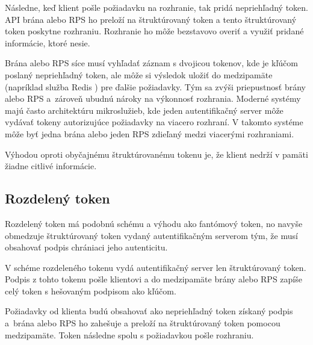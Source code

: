 Následne, keď klient pošle požiadavku na rozhranie, tak pridá nepriehľadný token. API brána alebo RPS ho preloží na štruktúrovaný token a tento štruktúrovaný token poskytne rozhraniu. Rozhranie ho môže bezstavovo overiť a využiť pridané informácie, ktoré nesie.

Brána alebo RPS síce musí vyhľadať záznam s dvojicou tokenov, kde je kľúčom poslaný nepriehľadný token, ale môže si výsledok uložiť do medzipamäte (napríklad služba Redis \cite{redis}) pre ďalšie požiadavky. Tým sa zvýši priepustnosť brány alebo RPS a~zároveň ubudnú nároky na výkonnosť rozhrania. Moderné systémy majú často architektúru mikroslužieb, kde jeden autentifikačný server môže vydávať tokeny autorizujúce požiadavky na viacero rozhraní. V takomto systéme môže byť jedna brána alebo jeden RPS zdieľaný medzi viacerými rozhraniami.

Výhodou oproti obyčajnému štruktúrovanému tokenu je, že klient nedrží v pamäti žiadne citlivé informácie.


\subsection{Rozdelený token}

Rozdelený token \cite{split_token} má podobnú schému a výhodu ako fantómový token, no navyše obmedzuje štruktúrovaný token vydaný autentifikačným serverom tým, že musí obsahovať podpis chrániaci jeho autenticitu.

V schéme rozdeleného tokenu vydá autentifikačný server len štruktúrovaný token. Podpis z tohto tokenu pošle klientovi a do medzipamäte brány alebo RPS zapíše celý token s hešovaným podpisom ako kľúčom.

Požiadavky od klienta budú obsahovať ako nepriehľadný token získaný podpis a~brána alebo RPS ho zahešuje a preloží na štruktúrovaný token pomocou medzipamäte. Token následne spolu s požiadavkou pošle rozhraniu.